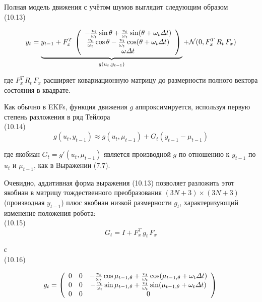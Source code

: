 \documentclass[10pt,a4paper]{article}
\begin{document}
Полная модель движения с учётом шумов выглядит следующим образом\\

(10.13)
\begin{minipage}{0.2\textwidth}
\begin{equation*}
y_t=\underbrace {y_{t-1}+F_x^T\,\left(\begin{array}{c} 
-\frac{v_t}{\omega_t}\sin\theta+\frac{v_t}{\omega_t}\sin(\theta+\omega_t\varDelta t)\\	\frac{v_t}{\omega_t}\cos\theta-\frac{v_t}{\omega_t}\cos(\theta+\omega_t\varDelta t)\\	\omega\varDelta t\\
\end{array} \right)\\}_{g(u_t,y_{t-1})}+\mathcal{N}(0,F_x^T\,R_t\,F_x)
\end{equation*}
\end{minipage}

где $F_x^T\,R_t\,F_x$ расширяет ковариационную матрицу до размерности полного вектора состояния в квадрате.

Как обычно в EKFs, функция движения $g$ аппроксимируется, используя первую степень разложения в ряд Тейлора\\

(10.14)
$$g(u_t,y_{t-1})\approx g(u_t,\mu_{t-1})+G_t(y_{t-1}-\mu_{t-1})$$

где якобиан $G_t=g'(u_t,\mu_{t-1})$ является производной $g$ по отношению к
$y_{t-1}$ по $u_t$ и $\mu_{t-1}$, как в Выражении (7.7).

Очевидно, аддитивная форма выражения (10.13) позволяет разложить этот якобиан в матрицу тождественного преобразования $(3N+3)\times(3N+3)$ (производная $y_{t-1}$) плюс якобиан низкой размерности $g_t$, характеризующий изменение положения робота:\\

(10.15)
$$G_t=I+F_x^T\,g_t\,F_x$$

с\\

(10.16)
\begin{minipage}{0.2\textwidth}
\begin{equation*}
g_t=\left(\begin{array}{ccc} 
0&0&-\frac{v_t}{\omega_t}\cos\mu_{t-1,\theta}+\frac{v_t}{\omega_t}\cos(\mu_{t-1,\theta}+\omega_t\varDelta t)\\	0&0&-\frac{v_t}{\omega_t}\sin\mu_{t-1,\theta}+\frac{v_t}{\omega_t}\sin(\mu_{t-1,\theta}+\omega_t\varDelta t)\\	0&0&0\\
\end{array} \right)\\
\end{equation*}
\end{minipage}
\end{document}
